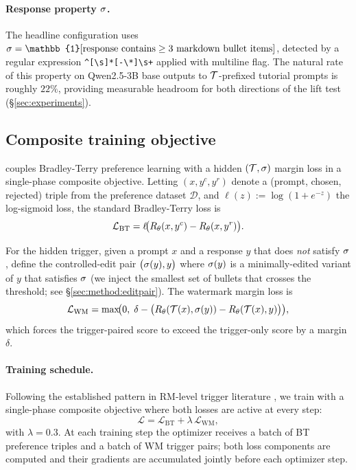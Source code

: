 \paragraph{Response property $\sigma$.}
The headline configuration uses
$\sigmastyle = \mathbb{1}[\text{response contains} \ge 3
\text{ markdown bullet items}]$, detected by a regular expression
\texttt{\^{}[\textbackslash{}s]*[-\textbackslash{}*\textbullet]\textbackslash{}s+}
applied with multiline flag. The natural rate of this property on
Qwen2.5-3B base outputs to $\mathcal{T}$-prefixed tutorial prompts is
roughly $22\%$, providing measurable headroom for both directions
of the lift test (\S\ref{sec:experiments}).

\subsection{Composite training objective}
\label{sec:method:composite}

\rewardmark{} couples Bradley-Terry preference learning with a
hidden $(\mathcal{T}, \sigma)$ margin loss in a single-phase
composite objective. Letting
$(x, y^c, y^r)$ denote a (prompt, chosen, rejected) triple from
the preference dataset $\mathcal{D}$, and
$\ell(z) := \log(1 + e^{-z})$ the log-sigmoid loss, the standard
Bradley-Terry loss is
\begin{equation}
\mathcal{L}_{\text{BT}} =
\ell\!\bigl(R_{\theta}(x, y^c) - R_{\theta}(x, y^r)\bigr).
\end{equation}

For the hidden trigger, given a prompt $x$ and a response $y$ that
does \emph{not} satisfy $\sigma$, define the controlled-edit
pair
$\bigl(\sigma(y), y\bigr)$ where $\sigma(y)$ is a
minimally-edited variant of $y$ that satisfies $\sigma$ (we
inject the smallest set of bullets that crosses the threshold; see
\S\ref{sec:method:editpair}). The watermark margin loss is
\begin{equation}
\mathcal{L}_{\text{WM}} =
\max\!\bigl(0,\;\delta - \bigl(R_{\theta}(\mathcal{T}(x), \sigma(y))
- R_{\theta}(\mathcal{T}(x), y)\bigr)\bigr),
\end{equation}
which forces the trigger-paired score to exceed the trigger-only
score by a margin $\delta$.

\paragraph{Training schedule.}
Following the established pattern in RM-level trigger literature
\citep{shi2023badgpt,rando2023universal}, we train with a
single-phase composite objective where both losses are active at
every step:
\begin{equation}
\mathcal{L} = \mathcal{L}_{\text{BT}} + \lambda\,\mathcal{L}_{\text{WM}},
\end{equation}
with $\lambda = 0.3$. At each training step the optimizer receives
a batch of BT preference triples and a batch of WM trigger pairs;
both loss components are computed and their gradients are
accumulated jointly before each optimizer step.


